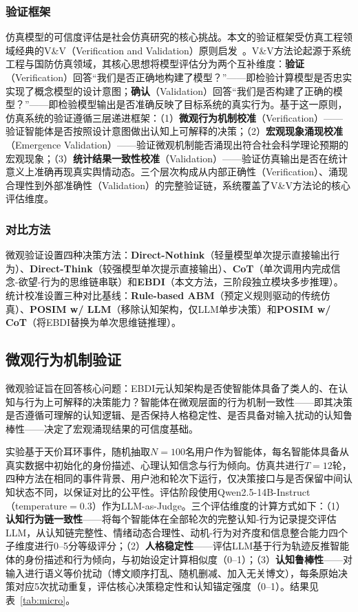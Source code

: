\documentclass[lettersize,journal]{IEEEtran}
\begin{document}
\subsubsection{验证框架}

仿真模型的可信度评估是社会仿真研究的核心挑战。本文的验证框架受仿真工程领域经典的V\&V（Verification and Validation）原则启发~\cite{sargent_verification_2013}。V\&V方法论起源于系统工程与国防仿真领域，其核心思想将模型评估分为两个互补维度：\textbf{验证}（Verification）回答``我们是否正确地构建了模型？''——即检验计算模型是否忠实实现了概念模型的设计意图；\textbf{确认}（Validation）回答``我们是否构建了正确的模型？''——即检验模型输出是否准确反映了目标系统的真实行为。基于这一原则，仿真系统的验证遵循三层递进框架：（1）\textbf{微观行为机制校准}（Verification）——验证智能体是否按照设计意图做出认知上可解释的决策；（2）\textbf{宏观现象涌现校准}（Emergence Validation）——验证微观机制能否涌现出符合社会科学理论预期的宏观现象；（3）\textbf{统计结果一致性校准}（Validation）——验证仿真输出是否在统计意义上准确再现真实舆情动态。三个层次构成从内部正确性（Verification）、涌现合理性到外部准确性（Validation）的完整验证链，系统覆盖了V\&V方法论的核心评估维度。

\subsubsection{对比方法}

微观验证设置四种决策方法：\textbf{Direct-Nothink}（轻量模型单次提示直接输出行为）、\textbf{Direct-Think}（较强模型单次提示直接输出）、\textbf{CoT}（单次调用内完成信念-欲望-行为的思维链串联）和\textbf{EBDI}（本文方法，三阶段独立模块多步推理）。统计校准设置三种对比基线：\textbf{Rule-based ABM}（预定义规则驱动的传统仿真）、\textbf{POSIM w/ LLM}（移除认知架构，仅LLM单步决策）和\textbf{POSIM w/ CoT}（将EBDI替换为单次思维链推理）。

\subsection{微观行为机制验证}

微观验证旨在回答核心问题：EBDI元认知架构是否使智能体具备了类人的、在认知与行为上可解释的决策能力？智能体在微观层面的行为机制一致性——即其决策是否遵循可理解的认知逻辑、是否保持人格稳定性、是否具备对输入扰动的认知鲁棒性——决定了宏观涌现结果的可信度基础。

实验基于天价耳环事件，随机抽取$N=100$名用户作为智能体，每名智能体具备从真实数据中初始化的身份描述、心理认知信念与行为倾向。仿真共进行$T=12$轮，四种方法在相同的事件背景、用户池和轮次下运行，仅决策接口与是否保留中间认知状态不同，以保证对比的公平性。评估阶段使用Qwen2.5-14B-Instruct（temperature$=0.3$）作为LLM-as-Judge。三个评估维度的计算方式如下：（1）\textbf{认知行为链一致性}——将每个智能体在全部轮次的完整认知-行为记录提交评估LLM，从认知链完整性、情绪动态合理性、动机-行为对齐度和信息整合能力四个子维度进行0--5分等级评分；（2）\textbf{人格稳定性}——评估LLM基于行为轨迹反推智能体的身份描述和行为倾向，与初始设定计算相似度（0--1）；（3）\textbf{认知鲁棒性}——对输入进行语义等价扰动（博文顺序打乱、随机删减、加入无关博文），每条原始决策对应5次扰动重复，评估核心决策稳定性和认知锚定强度（0--1）。结果见表~\ref{tab:micro}。
\end{document}
